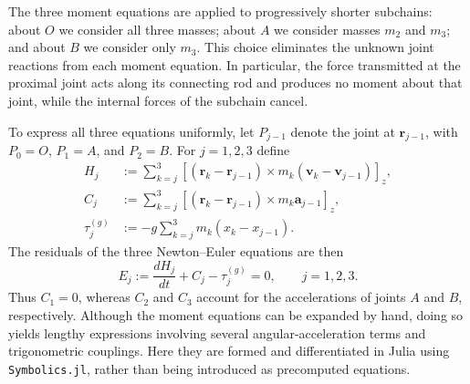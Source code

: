 The three moment equations are applied to progressively shorter subchains:
about $O$ we consider all three masses; about $A$ we consider masses $m_2$
and $m_3$; and about $B$ we consider only $m_3$. This choice eliminates the
unknown joint reactions from each moment equation. In particular, the force
transmitted at the proximal joint acts along its connecting rod and produces
no moment about that joint, while the internal forces of the subchain cancel.

To express all three equations uniformly, let $P_{j-1}$ denote the joint at
$\mathbf r_{j-1}$, with $P_0=O$, $P_1=A$, and $P_2=B$. For $j=1,2,3$ define
\begin{align}
    H_j &:= \sum_{k=j}^{3}
        \left[(\mathbf r_k-\mathbf r_{j-1})\times
        m_k(\mathbf v_k-\mathbf v_{j-1})\right]_z,
        \label{eq:triple_ne_Hj}\\
    C_j &:= \sum_{k=j}^{3}
        \left[(\mathbf r_k-\mathbf r_{j-1})\times
        m_k\mathbf a_{j-1}\right]_z,
        \label{eq:triple_ne_Cj}\\
    \tau_j^{(g)} &:= -g\sum_{k=j}^{3}
        m_k(x_k-x_{j-1}).
        \label{eq:triple_ne_tau}
\end{align}
The residuals of the three Newton--Euler equations are then
\begin{equation}
    E_j:=\frac{dH_j}{dt}+C_j-\tau_j^{(g)}=0,
    \qquad j=1,2,3.
    \label{eq:triple_ne_raw}
\end{equation}
Thus $C_1=0$, whereas $C_2$ and $C_3$ account for the accelerations of
joints $A$ and $B$, respectively. Although the moment equations can be
expanded by hand, doing so yields lengthy expressions involving several
angular-acceleration terms and trigonometric couplings. Here they are formed
and differentiated in Julia using \texttt{Symbolics.jl}, rather than being
introduced as precomputed equations.

